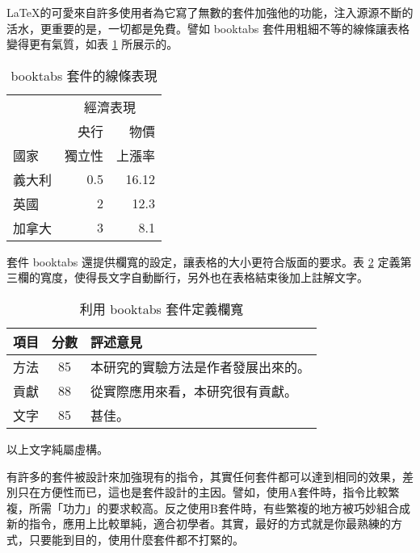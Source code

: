 \LaTeX 的可愛來自許多使用者為它寫了無數的套件加強他的功能，注入源源不斷的活水，更重要的是，一切都是免費。譬如 {\A booktabs} 套件用粗細不等的線條讓表格變得更有氣質，如表 \ref{basic_multi_col_2} 所展示的。

\begin{table}[ht]
    \centering
    \caption{{\C booktabs} 套件的線條表現}\label{basic_multi_col_2}
    \bigskip
    \extrarowheight=2pt
    \begin{tabular}{lrr}
    \toprule
              & \multicolumn{2}{c}{經濟表現}\\\cmidrule(l){2-3}
              & 央行      & 物價 \\[-2pt]
    國家    & 獨立性   & 上漲率 \\\midrule
    義大利 & 0.5        & 16.12 \\
    英國    & 2          & 12.3 \\
    加拿大 & 3          & 8.1 \\
    \bottomrule
    \end{tabular}
\end{table}

套件 {\A booktabs} 還提供欄寬的設定，讓表格的大小更符合版面的要求。表 \ref{booktabs_1} 定義第三欄的寬度，使得長文字自動斷行，另外也在表格結束後加上註解文字。

\begin{table}[h]
    \centering
    \caption{利用 {\C booktabs} 套件定義欄寬}\label{booktabs_1}
    \bigskip
    \begin{tabular}{lcp{2.5cm}}%
    \toprule
    項目      & 分數        & 評述意見 \\\midrule
    方法      & 85          & 本研究的實驗方法是作者發展出來的。 \\[2pt]
    貢獻      & 88          & 從實際應用來看，本研究很有貢獻。 \\[2pt]
    文字      & 85          & 甚佳。 \\
    \bottomrule
    \end{tabular}\par\smallskip %
    \parbox{5cm}{以上文字純屬虛構。}%
\end{table}

有許多的套件被設計來加強現有的指令，其實任何套件都可以達到相同的效果，差別只在方便性而已，這也是套件設計的主因。譬如，使用A套件時，指令比較繁複，所需「功力」的要求較高。反之使用B套件時，有些繁複的地方被巧妙組合成新的指令，應用上比較單純，適合初學者。其實，最好的方式就是你最熟練的方式，只要能到目的，使用什麼套件都不打緊的。

